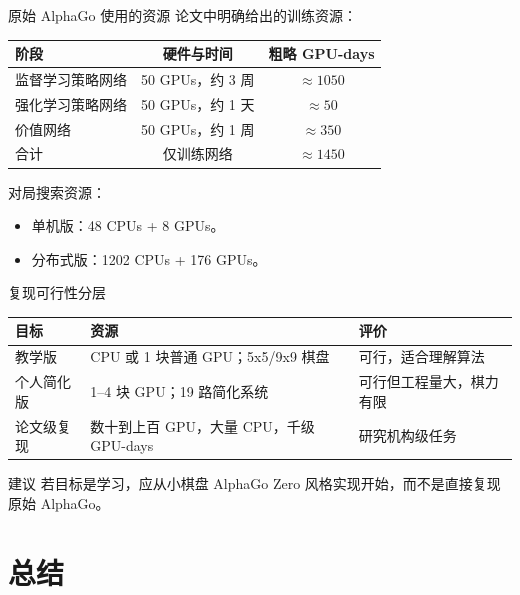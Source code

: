 \documentclass[UTF8,aspectratio=169,10pt]{ctexbeamer}
\begin{document}
\begin{frame}{原始 AlphaGo 使用的资源}
  论文中明确给出的训练资源：

  \begin{center}
    \begin{tabular}{lcc}
      \toprule
      阶段 & 硬件与时间 & 粗略 GPU-days \\
      \midrule
      监督学习策略网络 & 50 GPUs，约 3 周 & $\approx 1050$ \\
      强化学习策略网络 & 50 GPUs，约 1 天 & $\approx 50$ \\
      价值网络 & 50 GPUs，约 1 周 & $\approx 350$ \\
      \midrule
      合计 & 仅训练网络 & $\approx 1450$ \\
      \bottomrule
    \end{tabular}
  \end{center}

  对局搜索资源：
  \begin{itemize}
    \item 单机版：48 CPUs + 8 GPUs。
    \item 分布式版：1202 CPUs + 176 GPUs。
  \end{itemize}
\end{frame}

\begin{frame}{复现可行性分层}
  \begin{center}
    \begin{tabular}{p{}p{}p{}}
      \toprule
      目标 & 资源 & 评价 \\
      \midrule
      教学版 & CPU 或 1 块普通 GPU；5x5/9x9 棋盘 & 可行，适合理解算法 \\
      个人简化版 & 1--4 块 GPU；19 路简化系统 & 可行但工程量大，棋力有限 \\
      论文级复现 & 数十到上百 GPU，大量 CPU，千级 GPU-days & 研究机构级任务 \\
      \bottomrule
    \end{tabular}
  \end{center}

  \begin{alertblock}{建议}
    若目标是学习，应从小棋盘 AlphaGo Zero 风格实现开始，而不是直接复现原始 AlphaGo。
  \end{alertblock}
\end{frame}

\section{总结}
\end{document}
